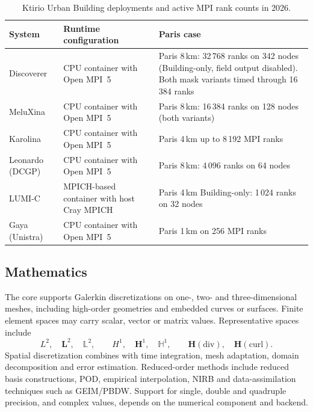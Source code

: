 \begin{table}[H]
  \caption{Ktirio Urban Building deployments and active MPI rank counts in 2026.}
  \label{tab:Feelpp:hpc-deployments}
  \small
  \renewcommand{\arraystretch}{1.15}
  \begin{tabularx}{\linewidth}{@{}>{\raggedright\arraybackslash}p{.18\linewidth}
    >{\raggedright\arraybackslash}p{.34\linewidth}>{\raggedright\arraybackslash}X@{}}
    \toprule
    \textbf{System} & \textbf{Runtime configuration} & \textbf{Paris case} \\
    \midrule
    Discoverer & CPU container with Open MPI~5 & Paris 8\,km: 32\,768 ranks on 342 nodes (Building-only, field output disabled). Both mask variants timed through 16\,384 ranks \\
    MeluXina & CPU container with Open MPI~5 & Paris 8\,km: 16\,384 ranks on 128 nodes (both variants) \\
    Karolina & CPU container with Open MPI~5 & Paris 4\,km up to 8\,192 MPI ranks \\
    Leonardo (DCGP) & CPU container with Open MPI~5 & Paris 8\,km: 4\,096 ranks on 64 nodes \\
    LUMI-C & MPICH-based container with host Cray MPICH & Paris 4\,km Building-only: 1\,024 ranks on 32 nodes \\
    Gaya (Unistra) & CPU container with Open MPI~5 & Paris 1\,km on 256 MPI ranks \\
    \bottomrule
  \end{tabularx}
\end{table}



\subsection{Mathematics}
\label{sec:Feelpp:mathematics}
The core supports Galerkin discretizations on one-, two- and three-dimensional
meshes, including high-order geometries and embedded curves or surfaces.
Finite element spaces may carry scalar, vector or matrix values. Representative
spaces include
\[
  L^2,\quad \mathbf{L}^2,\quad \mathbb{L}^2,\qquad
  H^1,\quad \mathbf{H}^1,\quad \mathbb{H}^1,\qquad
  \mathbf{H}(\mathrm{div}),\quad \mathbf{H}(\mathrm{curl}).
\]
Spatial discretization combines with time integration, mesh adaptation,
domain decomposition and error estimation. Reduced-order methods include
reduced basis constructions, POD, empirical interpolation, NIRB and
data-assimilation techniques such as GEIM/PBDW.
Support for single, double and quadruple precision, and complex values, depends
on the numerical component and backend.

